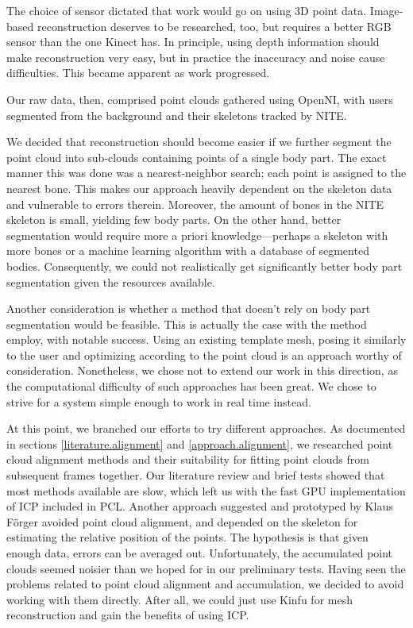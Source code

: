The choice of sensor dictated that work would go on using 3D point data. Image-based reconstruction deserves to be researched, too, but requires a better RGB sensor than the one Kinect has. In principle, using depth information should make reconstruction very easy, but in practice the inaccuracy and noise cause difficulties. This became apparent as work progressed.

Our raw data, then, comprised point clouds gathered using OpenNI, with users segmented from the background and their skeletons tracked by NITE.

We decided that reconstruction should become easier if we further segment the point cloud into sub-clouds containing points of a single body part. The exact manner this was done was a nearest-neighbor search; each point is assigned to the nearest bone. This makes our approach heavily dependent on the skeleton data and vulnerable to errors therein. Moreover, the amount of bones in the NITE skeleton is small, yielding few body parts. On the other hand, better segmentation would require more a priori knowledge---perhaps a skeleton with more bones or a machine learning algorithm with a database of segmented bodies. Consequently, we could not realistically get significantly better body part segmentation given the resources available.

Another consideration is whether a method that doesn't rely on body part segmentation would be feasible. This is actually the case with the method \citet{weiss2011home} employ, with notable success. Using an existing template mesh, posing it similarly to the user and optimizing according to the point cloud is an approach worthy of consideration. Nonetheless, we chose not to extend our work in this direction, as the computational difficulty of such approaches has been great. We chose to strive for a system simple enough to work in real time instead.

At this point, we branched our efforts to try different approaches. As documented in sections \ref{literature.alignment} and \ref{approach.alignment}, we researched point cloud alignment methods and their suitability for fitting point clouds from subsequent frames together. Our literature review and brief tests showed that most methods available are slow, which left us with the fast GPU implementation of ICP included in PCL. Another approach suggested and prototyped by Klaus Förger avoided point cloud alignment, and depended on the skeleton for estimating the relative position of the points. The hypothesis is that given enough data, errors can be averaged out. Unfortunately, the accumulated point clouds seemed noisier than we hoped for in our preliminary tests. Having seen the problems related to point cloud alignment and accumulation, we decided to avoid working with them directly. After all, we could just use Kinfu for mesh reconstruction and gain the benefits of using ICP.


